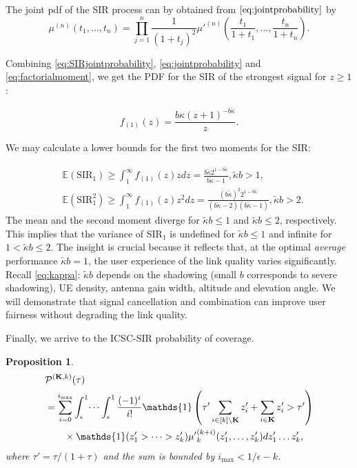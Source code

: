 \documentclass[lettersize,journal]{IEEEtran}
\newtheorem{prop}[theorem]{Proposition}
\begin{document}
The joint pdf of the SIR process can by obtained from $\eqref{eq:jointprobability}$ by
\begin{equation}
  \label{eq:SIRjointprobability}
  \mu^{(n)}(t_1,\dots,t_n) = \prod_{j=1}^n\frac{1}{(1+t_j)^2}\mu'^{(n)}\left(\frac{t_1}{1+t_1},\dots,\frac{t_n}{1+t_n}\right).
\end{equation}

Combining \eqref{eq:SIRjointprobability}, \eqref{eq:jointprobability} and \eqref{eq:factorialmoment}, we get the PDF for the SIR of the strongest signal for $z\geq 1$:

\begin{equation}
  f_{(1)}(z) = \frac {b\kappa\left({z + 1} \right)^{-b\tilde{\kappa}}} {z}.
\end{equation}


We may calculate a lower bounds for the first two moments for the SIR:



\begin{align}
  &\mathbb{E}(\text{SIR}_1)  \geq\int_{1}^{\infty}f_{(1)}(z)zdz=\frac{b \tilde{\kappa}  2^{1-b \tilde{\kappa} }}{b \tilde{\kappa} -1}, \tilde{\kappa}b >1, \\
  &\mathbb{E}(\text{SIR}^2_1) \geq \int_{1}^{\infty}f_{(1)}(z)z^2dz = \frac{(b \tilde{\kappa}) ^2 2^{1-b \tilde{\kappa} }}{(b\tilde{\kappa} - 2)  (b\tilde{\kappa} - 1)},\tilde{\kappa}b >2.
\end{align}
The mean and the second moment diverge for $\tilde{\kappa}b\leq 1$ and $\tilde{\kappa}b\leq 2$, respectively. This implies that the variance of SIR$_1$ is undefined for $\tilde{\kappa}b \leq 1$ and infinite for $1 <\tilde{\kappa}b \leq 2$. The insight is crucial because it reflects that, at the optimal \textit{average} performance $\tilde{\kappa}b = 1$, the user experience of the link quality varies significantly. Recall \eqref{eq:kappa}: $\tilde{\kappa}b$ depends on the shadowing (small $b$ corresponds to severe shadowing), UE density, antenna gain width, altitude and elevation angle. We will demonstrate that signal cancellation and combination can improve user fairness without degrading the link quality.




Finally, we arrive to the ICSC-SIR probability of coverage.
\begin{prop}
  \begin{align}
    &\mathcal{P}^{(\mathbf{K},k)}(\tau) \nonumber\\
    &= \sum^{i_{\text{max}}}_{i=0} \int_{\epsilon}^1 \dots \int_{\epsilon}^1\frac{(-1)^i}{i!}\mathds{1}\left(\tau' \sum_{i \in [k] \setminus  \mathbf{K}}z'_i+ \sum_{i\in \mathbf{K}} z'_i>\tau' \right) \nonumber \\
    &\hspace{0.7cm}\times \mathds{1}(z'_1>\dots>z'_k){\mu'}_k^{(k+i)}(z'_1,\dots,z'_k) d z'_1 \dots z'_k,
  \end{align}
  where $\tau' = \tau/(1+\tau)$ and the sum is bounded by $i_{\text{max}}< 1/\epsilon-k$. 
\end{prop}
\end{document}
